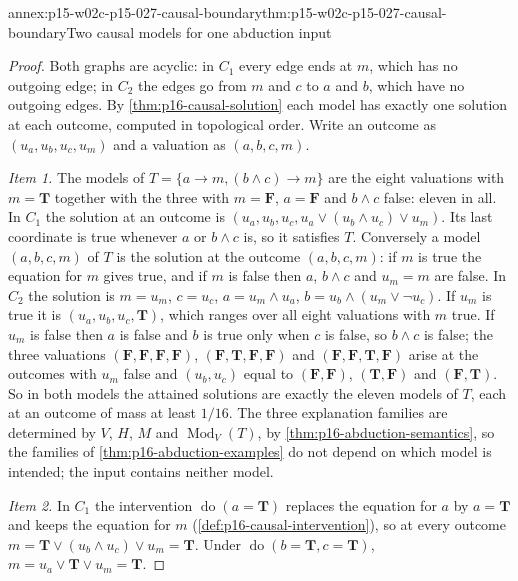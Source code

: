 \begin{annexitem}{annex:p15-w02c-p15-027-causal-boundary}{thm:p15-w02c-p15-027-causal-boundary}{Two causal models for one abduction input}
\begin{proof}
Both graphs are acyclic: in \(C_1\) every edge ends at \(m\), which has no
outgoing edge; in \(C_2\) the edges go from \(m\) and \(c\) to \(a\) and
\(b\), which have no outgoing edges. By \cref{thm:p16-causal-solution}
each model has exactly one solution at each outcome, computed in
topological order. Write an outcome as \((u_a,u_b,u_c,u_m)\) and a
valuation as \((a,b,c,m)\).

\emph{Item 1.} The models of \(T=\{a\to m,(b\land c)\to m\}\) are the
eight valuations with \(m=\mathbf T\) together with the three with
\(m=\mathbf F\), \(a=\mathbf F\) and \(b\land c\) false: eleven in all.
In \(C_1\) the solution at an outcome is
\((u_a,u_b,u_c,u_a\lor(u_b\land u_c)\lor u_m)\). Its last coordinate is
true whenever \(a\) or \(b\land c\) is, so it satisfies \(T\). Conversely
a model \((a,b,c,m)\) of \(T\) is the solution at the outcome
\((a,b,c,m)\): if \(m\) is true the equation for \(m\) gives true, and if
\(m\) is false then \(a\), \(b\land c\) and \(u_m=m\) are false. In
\(C_2\) the solution is \(m=u_m\), \(c=u_c\), \(a=u_m\land u_a\),
\(b=u_b\land(u_m\lor\neg u_c)\). If \(u_m\) is true it is
\((u_a,u_b,u_c,\mathbf T)\), which ranges over all eight valuations with
\(m\) true. If \(u_m\) is false then \(a\) is false and \(b\) is true only
when \(c\) is false, so \(b\land c\) is false; the three valuations
\((\mathbf F,\mathbf F,\mathbf F,\mathbf F)\),
\((\mathbf F,\mathbf T,\mathbf F,\mathbf F)\) and
\((\mathbf F,\mathbf F,\mathbf T,\mathbf F)\) arise at the outcomes with
\(u_m\) false and \((u_b,u_c)\) equal to \((\mathbf F,\mathbf F)\),
\((\mathbf T,\mathbf F)\) and \((\mathbf F,\mathbf T)\). So in both models
the attained solutions are exactly the eleven models of \(T\), each at
an outcome of mass at least \(1/16\). The three explanation families are
determined by \(V\), \(H\), \(M\) and \(\operatorname{Mod}_V(T)\), by
\cref{thm:p16-abduction-semantics}, so the families of
\cref{thm:p16-abduction-examples} do not depend on which model is
intended; the input contains neither model.

\emph{Item 2.} In \(C_1\) the intervention \(\operatorname{do}(a=\mathbf T)\)
replaces the equation for \(a\) by \(a=\mathbf T\) and keeps the equation
for \(m\) (\cref{def:p16-causal-intervention}), so at every outcome
\(m=\mathbf T\lor(u_b\land u_c)\lor u_m=\mathbf T\). Under
\(\operatorname{do}(b=\mathbf T,c=\mathbf T)\),
\(m=u_a\lor\mathbf T\lor u_m=\mathbf T\).


\end{proof}
\end{annexitem}
